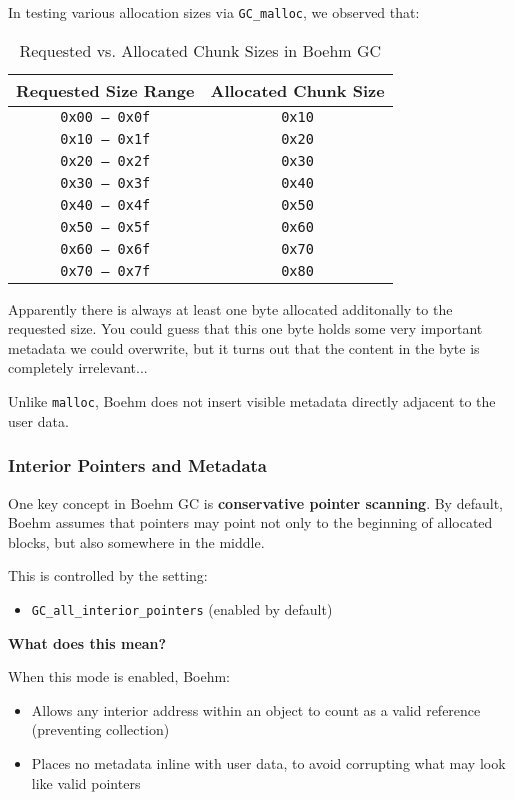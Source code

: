 \documentclass[a4paper,11pt]{article}
\begin{document}
In testing various allocation sizes via \texttt{GC\_malloc}, we observed that:
\begin{table}[h!]
    \centering
    \begin{tabular}{|c|c|}
        \hline
        \textbf{Requested Size Range} & \textbf{Allocated Chunk Size} \\
        \hline
        \texttt{0x00 -- 0x0f} & \texttt{0x10} \\
        \texttt{0x10 -- 0x1f} & \texttt{0x20} \\
        \texttt{0x20 -- 0x2f} & \texttt{0x30} \\
        \texttt{0x30 -- 0x3f} & \texttt{0x40} \\
        \texttt{0x40 -- 0x4f} & \texttt{0x50} \\
        \texttt{0x50 -- 0x5f} & \texttt{0x60} \\
        \texttt{0x60 -- 0x6f} & \texttt{0x70} \\
        \texttt{0x70 -- 0x7f} & \texttt{0x80} \\
        \hline
    \end{tabular}
    \caption{Requested vs. Allocated Chunk Sizes in Boehm GC}
    \label{tab:chunk-sizes}
\end{table}

Apparently there is always at least one byte allocated additonally to the requested size. You could guess that this one byte holds some very important metadata we could overwrite, but it turns out that the content in the byte is completely irrelevant... 


Unlike \texttt{malloc}, Boehm does not insert visible metadata directly adjacent to the user data.

\subsubsection*{Interior Pointers and Metadata}
One key concept in Boehm GC is \textbf{conservative pointer scanning}. By default, Boehm assumes that pointers may point not only to the beginning of allocated blocks, but also somewhere in the middle.

This is controlled by the setting:
\begin{itemize}
    \item \texttt{GC\_all\_interior\_pointers} (enabled by default)
\end{itemize}

\textbf{What does this mean?}

When this mode is enabled, Boehm:
\begin{itemize}
    \item Allows any interior address within an object to count as a valid reference (preventing collection)
    \item Places no metadata inline with user data, to avoid corrupting what may look like valid pointers
\end{itemize}
\end{document}
